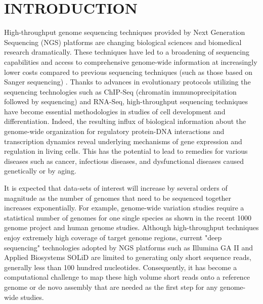 \documentclass{cpeauth}
\begin{document}


\section{INTRODUCTION} 


High-throughput genome sequencing techniques provided by Next
Generation Sequencing (NGS) platforms are changing biological sciences
and biomedical research
dramatically\cite{mardis2008-tig,mardis2008-arghg}. These techniques
have led to a broadening of sequencing capabilities and access to
comprehensive genome-wide information at increasingly lower costs
compared to previous sequencing techniques (such as those based on
Sanger sequencing)
\cite{metzker2010,mardis2008-tig,mardis2008-arghg,gilad2009,mortazavi2008,sorek2010}.
Thanks to advances in evolutionary protocols utilizing the sequencing
technologies such as ChIP-Seq (chromatin immunoprecipitation followed
by sequencing) and RNA-Seq, high-throughput sequencing techniques have
become essential methodologies in studies of cell development and
differentiation\cite{wang2009-natrevgen,pepke2009,gilad2009,mortazavi2008,sorek2010}.
Indeed, the resulting influx of biological information about the
genome-wide organization for regulatory protein-DNA interactions and
transcription dynamics reveal underlying mechanisms of gene expression
and regulation in living cells. This has the potential to lead to
remedies for various diseases such as cancer, infectious diseases, and
dysfunctional diseases caused genetically or by
aging\cite{amaral2008,encode2007,baek2008,costa2009}.


It is expected that data-sets of interest will increase by several
orders of magnitude as the number of genomes that need to be sequenced
together increases exponentially.  For example, genome-wide variation
studies require a statistical number of genomes for one single species
as shown in the recent 1000 genome project and human genome
studies\cite{1000genome,mardis2008-tig,gilad2009,alex2009,kim2011}.
Although high-throughput techniques enjoy extremely high coverage of
target genome regions, current "deep sequencing" technologies adopted
by NGS platforms such as Illumina GA II and Applied Biosystems SOLiD
are limited to generating only short sequence reads, generally less
than 100 hundred nucleotides\cite{metzker2010}. Consequently, it has
become a computational challenge to map these high volume short reads
onto a reference genome or de novo assembly that are needed as the
first step for any genome-wide
studies\cite{alex2009,trapnell2009,scheibye-alsing2009,pop2002,hernandez2008,farrer2008}.
\end{document}
